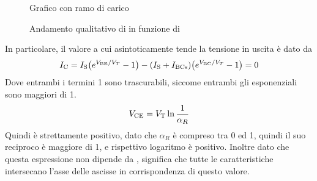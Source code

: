 \documentclass[../elettronica]{subfiles}
\begin{document}
\newpage
\begin{figure}[h]
    \centering
    \begin{minipage}{.48\textwidth}
        \def\vt{1}
        \def\kuno{1.250}
        \def\kdue{3}
        \label{graph:ramo_di_carico}
        \caption{Grafico con ramo di carico}
    \end{minipage}
    \begin{minipage}{.48\textwidth}
        \caption{Andamento qualitativo di \vu in funzione di \vi}
    \end{minipage}
\end{figure}

\noindent
In particolare, il valore a cui asintoticamente tende la tensione in uscita è dato da
\[
    I_{\text{C}} = I_{\text{S}} \big(e^{V_{\text{BE}}/V_T} -1\big) - (I_{\text{S}} + I_{\text{BCs}}) \big(e^{V_{\text{BC}}/V_T} -1\big) = 0
\]
Dove entrambi i termini 1 sono trascurabili, siccome entrambi gli esponenziali sono maggiori di 1.
\[
    V_{\text{CE}}  = V_{\text{T}} \ln{\frac{1}{\alpha_R}}
\]
Quindi \vce è strettamente positivo, dato che $\alpha_R$ è compreso tra 0 ed 1, quindi il suo reciproco è maggiore di 1, e
rispettivo logaritmo è positivo.
Inoltre dato che questa espressione non dipende da \vbe, significa che tutte le caratteristiche intersecano l'asse delle ascisse
in corrispondenza di questo valore.
\end{document}
